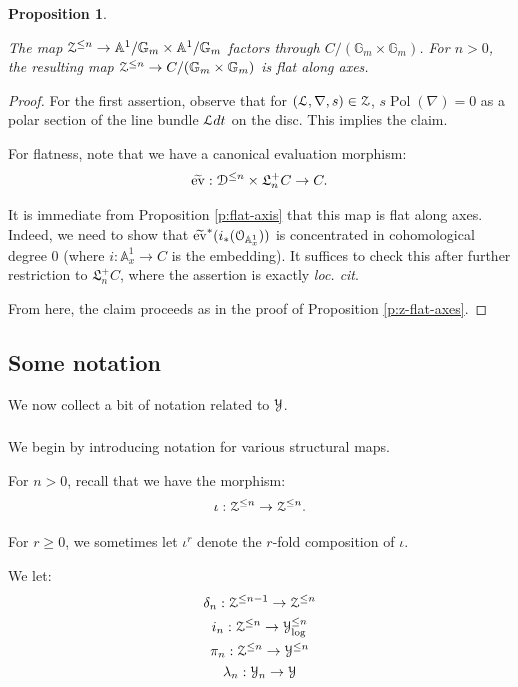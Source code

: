 \documentclass[reqno,11pt]{amsart}
\numberwithin{equation}{subsection}
\newtheorem{prop}[thm]{Proposition}
\theoremstyle{remark}
\newcommand{\bA}{{\mathbb A}}
\newcommand{\bG}{{\mathbb G}}
\newcommand{\sD}{{\EuScript D}}
\newcommand{\sL}{{\EuScript L}}
\newcommand{\sO}{{\EuScript O}}
\newcommand{\sY}{{\EuScript Y}}
\newcommand{\sZ}{{\EuScript Z}}
\newcommand{\fL}{{\mathfrak L}}
\newcommand{\on}{\operatorname}
\newcommand{\ev}{\on{ev}}
\newcommand{\Pol}{\on{Pol}}
\begin{document}
\begin{prop}\label{p:z-flat-axes-var}

The map
$\sZ^{\leq n} \to \bA^1/\bG_m \times \bA^1/\bG_m$ factors
through $C/(\bG_m\times\bG_m)$. For $n>0$, 
the resulting map 
$\sZ^{\leq n} \to C/(\bG_m\times\bG_m)$ is flat along
axes. 

\end{prop}

\begin{proof}

For the first assertion, observe that
for $(\sL,\nabla,s) \in \sZ$, 
$s\Pol(\nabla) = 0$ as a polar section
of the line bundle $\sL dt$ on the disc. 
This implies the claim.

For flatness, note that we 
have a canonical evaluation morphism:
%
\[
\widetilde{\ev}:
\sD^{\leq n} \times \fL_n^+ C \to C.
\]

\noindent It is immediate from 
Proposition \ref{p:flat-axis} that this map 
is flat along axes. Indeed, we need to show
that $\widetilde{\ev}^*(i_*(\sO_{\bA_x^1}))$
is concentrated in cohomological degree $0$
(where $i:\bA_x^1 \to C$ is the embedding).
It suffices to check this after further restriction
to $\fL_n^+ C$, where the assertion is 
exactly \emph{loc. cit}.

From here, the claim proceeds as in the proof of 
Proposition \ref{p:z-flat-axes}.

\end{proof}

\subsection{Some notation}\label{ss:y-not}

We now collect a bit of notation related
to $\sY$.

\subsubsection{}\label{sss:maps-notation}

We begin by introducing notation for various structural maps. 

For $n>0$, recall that we have the morphism:
%
\[
\iota:\sZ^{\leq n} \to \sZ^{\leq n}.
\]

\noindent For $r \geq 0$, we sometimes let $\iota^r$ denote the $r$-fold
composition of $\iota$.

We let:
%
\[
\begin{gathered}
\delta_n:\sZ^{\leq n-1} \to \sZ^{\leq n} \\
i_n:\sZ^{\leq n} \to \sY_{\log}^{\leq n} \\
\pi_n:\sZ^{\leq n} \to \sY^{\leq n} \\
\lambda_n:\sY_n \to \sY
\end{gathered}
\]
\end{document}
